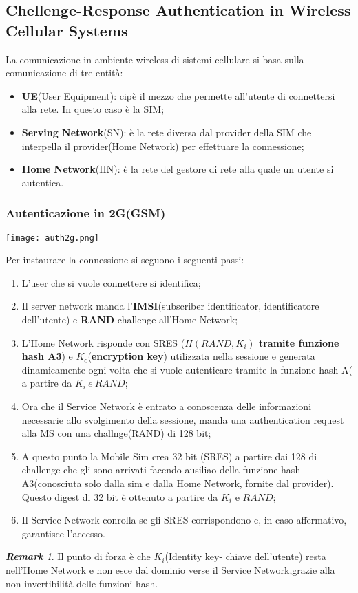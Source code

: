 \documentclass{article}
\theoremstyle{remark}
\newtheorem*{remark}{\textbf{Remark}}
\begin{document}
\subsection{Chellenge-Response Authentication in Wireless Cellular Systems}
La comunicazione in ambiente wireless di sistemi cellulare si basa sulla comunicazione di tre entità:\begin{itemize}
	\item \textbf{UE}(User Equipment): cipè il mezzo che permette all'utente di connettersi alla rete. In questo caso è la SIM;
	\item \textbf{Serving Network}(SN): è la rete diversa dal provider della SIM che interpella il provider(Home Network) per effettuare la connessione;
	\item \textbf{Home Network}(HN): è la rete del gestore di rete alla quale un utente si autentica.
\end{itemize}
\subsubsection{Autenticazione in 2G(GSM)}
\begin{center}
	\texttt{[image: auth2g.png]}
\end{center}
Per instaurare la connessione si seguono i seguenti passi:\begin{enumerate}
	\item L'user che si vuole connettere si identifica;
	\item Il server network manda l'\textbf{IMSI}(subscriber identificator, identificatore dell'utente) e \textbf{RAND} challenge all'Home Network;
	\item L'Home Network risponde con SRES (\textbf{$H(RAND,K_i)$ tramite funzione hash A3}) e $K_c$(\textbf{encryption key}) utilizzata nella sessione e generata dinamicamente ogni volta che si vuole autenticare tramite la funzione hash A( a partire da $K_i \ e\ RAND$;
	\item Ora che il Service Network è entrato a conoscenza delle informazioni necessarie allo svolgimento della sessione, manda una authentication request alla MS con una challnge(RAND) di 128 bit;
	\item A questo punto la Mobile Sim crea 32 bit (SRES) a partire dai 128 di challenge che gli sono arrivati facendo ausiliao della funzione hash A3(conosciuta solo dalla sim e dalla Home Network, fornite dal provider). Questo digest di 32 bit è ottenuto a partire da $K_i$ e $RAND$;
	\item Il Service Network conrolla se gli SRES corrispondono e, in caso affermativo, garantisce l'accesso.
\end{enumerate}
\begin{remark}
	Il punto di forza è che $K_i$(Identity key- chiave dell'utente) resta nell'Home Network e non esce dal dominio verse il Service Network,grazie alla non invertibilità delle funzioni hash.
\end{remark}
\end{document}
